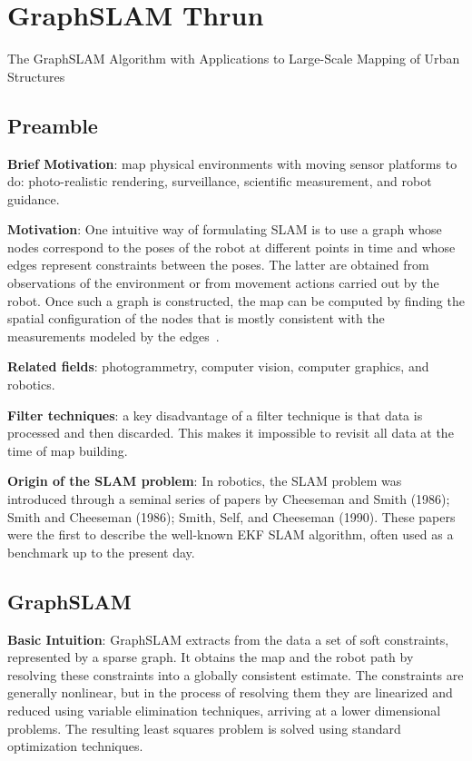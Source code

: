 \chapter{GraphSLAM  Thrun}
{\large The GraphSLAM Algorithm with Applications to Large-Scale Mapping of Urban Structures}

\section{Preamble}
\textbf{Brief Motivation}: map physical environments with moving sensor platforms to  do: photo-realistic rendering, surveillance, scientific measurement, and robot guidance. 

\textbf{Motivation}: One intuitive way of formulating SLAM is to use a graph whose nodes correspond to the poses of the robot at different points in time and whose edges represent constraints between the poses. The latter are obtained from observations of the environment or from movement actions carried out by the robot. Once such a graph is constructed, the map can be computed by finding the spatial configuration of the nodes that is mostly consistent with the measurements modeled by the edges~\cite{Graph-Based-SLAM-Grisetti}.

\textbf{Related fields}: photogrammetry, computer vision, computer graphics, and robotics.

\textbf{Filter techniques}: a key disadvantage of a filter technique is that data is processed and then discarded. This makes it impossible to revisit all data at the time of map building. 

\textbf{Origin of the SLAM problem}: In robotics, the SLAM problem was introduced through a seminal series of papers by Cheeseman and Smith (1986); Smith and Cheeseman (1986); Smith, Self, and Cheeseman (1990). These papers were the first to describe the well-known EKF SLAM algorithm, often used as a benchmark up to the present day.

\section{GraphSLAM}
\textbf{Basic Intuition}: GraphSLAM extracts from the data a set of soft constraints, represented by a sparse graph. It obtains the map and the robot path by resolving these constraints into a globally consistent estimate. The constraints are generally nonlinear, but in the process of resolving them they are linearized and reduced using variable elimination techniques, arriving at a lower dimensional problems. The resulting least squares problem is solved using standard optimization techniques.

